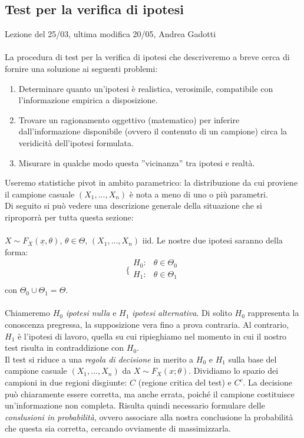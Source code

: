 

\subsection{Test per la verifica di ipotesi}
Lezione del 25/03, ultima modifica 20/05, Andrea Gadotti
\\ \\

La procedura di test per la verifica di ipotesi che descriveremo a breve cerca di fornire una soluzione ai seguenti problemi:
\begin{enumerate}
\item Determinare quanto un'ipotesi è realistica, verosimile, compatibile con l'informazione empirica a disposizione.
\item Trovare un ragionamento oggettivo (matematico) per inferire dall'informazione disponibile (ovvero il contenuto di un campione) circa la veridicità dell'ipotesi formulata.
\item Misurare in qualche modo questa ''vicinanza'' tra ipotesi e realtà.
\end{enumerate}
Useremo statistiche pivot in ambito parametrico: la distribuzione da cui proviene il campione casuale $(X_1,...,X_n)$ è nota a meno di uno o più parametri.\\
Di seguito si può vedere una descrizione generale della situazione che si riproporrà per tutta questa sezione:\\
\\
$X \sim F_X(\underline{x},\theta)$, $\theta \in \Theta$, $(X_1,...,X_n)$ iid. Le nostre due ipotesi saranno della forma:
$$\bigg \{
\begin{array}{rl}
H_0: & \theta \in \Theta_0 \\
H_1: & \theta \in \Theta_1 \\
\end{array}
$$
con $\Theta_0 \cup \Theta_1 = \Theta$.\\
\\
Chiameremo $H_0$ \textit{ipotesi nulla} e $H_1$ \textit{ipotesi alternativa}. Di solito $H_0$ rappresenta la conoscenza pregressa, la supposizione vera fino a prova contraria. Al contrario, $H_1$ è l'ipotesi di lavoro, quella su cui ripieghiamo nel momento in cui il nostro test risulta in contraddizione con $H_0$.\\
Il test si riduce a una \textit{regola di decisione} in merito a $H_0$ e $H_1$ sulla base del campione casuale $(X_1,...,X_n)$ da $X \sim F_X (x;\theta)$. Dividiamo lo spazio dei campioni in due regioni disgiunte: $C$ (regione critica del test) e $C^c$. La decisione può chiaramente essere corretta, ma anche errata, poiché il campione costituisce un'informazione non completa. Risulta quindi necessario formulare delle \textit{conslusioni in probabilità}, ovvero associare alla nostra conclusione la probabilità che questa sia corretta, cercando ovviamente di massimizzarla.\\
